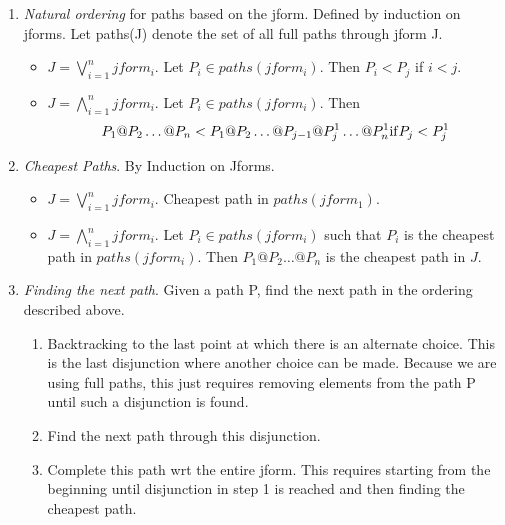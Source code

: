 \begin{enumerate}
\item {\em Natural ordering} for paths based on the jform. Defined by 
induction on jforms. Let paths(J) denote the set of all full paths through 
jform J.
\begin{itemize}
\item $J = \bigvee^{n}_{i=1} jform_{i}$. Let $P_{i} \in paths(jform_{i})$. Then
$P_{i} < P_{j}$ if $i < j$.

\item $J = \bigwedge^{n}_{i=1} jform_{i}$. Let $P_{i} \in paths(jform_{i})$. 
Then \[P_{1}@P_{2}\ldots @P_{n} < P_{1}@P_{2}\ldots%
@P_{j-1}@P^{1}_{j}\ldots @P^{1}_{n} \mbox{\/\rm if\/} P_{j} < P^{1}_{j}\]

\end{itemize}

\item {\em Cheapest Paths}. By Induction on Jforms.
\begin{itemize}
\item $J = \bigvee^{n}_{i=1} jform_{i}$. Cheapest path in $paths(jform_{1})$.

\item $J = \bigwedge^{n}_{i=1} jform_{i}$. Let $P_{i} \in paths(jform_{i})$
such that $P_{i}$ is the cheapest path in $paths(jform_{i})$.
Then $P_{1}@P_{2}\ldots @P_{n}$ is the cheapest path in $J$.

\end{itemize}

\item {\em Finding the next path}. Given a path P, find the next path in
the ordering described above.

\begin{enumerate}
\item Backtracking to the last point at which there is an alternate choice.
This is the last disjunction where another choice can be made. Because we
are using full paths, this just requires removing elements from the path P
until such a disjunction is found.

\item Find the next path through this disjunction.

\item Complete this path wrt the entire jform. This requires starting from
the beginning until disjunction in step 1 is reached and then finding
the cheapest path.
\end{enumerate}
\end{enumerate}
